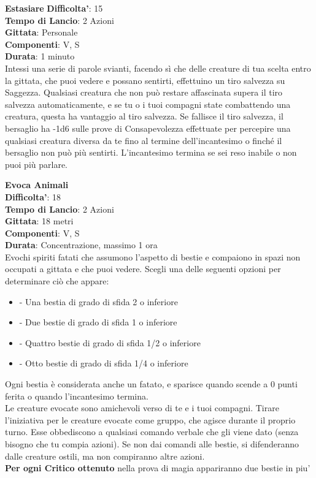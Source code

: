 \begin{multicols}{2}
\medskip\textbf{Estasiare}
\textbf{Difficolta'}: 15\\
\textbf{Tempo di Lancio}: 2 Azioni\\
\textbf{Gittata}: Personale\\
\textbf{Componenti}: V, S\\
\textbf{Durata}: 1 minuto\\
Intessi una serie di parole svianti, facendo sì che delle creature di tua scelta entro la gittata, che puoi vedere e possano sentirti, effettuino un tiro salvezza su Saggezza. Qualsiasi creatura che non può restare affascinata supera il tiro salvezza automaticamente, e se tu o i tuoi compagni state combattendo una creatura, questa ha vantaggio al tiro salvezza. Se fallisce il tiro salvezza, il bersaglio ha -1d6 sulle prove di Consapevolezza effettuate per percepire una qualsiasi creatura diversa da te fino al termine dell’incantesimo o finché il bersaglio non può più sentirti.
L’incantesimo termina se sei reso inabile o non puoi più parlare.

\medskip\textbf{Evoca Animali}\\
\textbf{Difficolta'}: 18\\
\textbf{Tempo di Lancio}: 2 Azioni\\
\textbf{Gittata}: 18 metri\\
\textbf{Componenti}: V, S\\
\textbf{Durata}: Concentrazione, massimo 1 ora\\
Evochi spiriti fatati che assumono l’aspetto di bestie e compaiono in spazi non occupati a gittata e che puoi vedere. Scegli una delle seguenti opzioni per determinare ciò che appare:
\begin{itemize}
\item
- Una bestia di grado di sfida 2 o inferiore
\item
- Due bestie di grado di sfida 1 o inferiore
\item
- Quattro bestie di grado di sfida 1/2 o inferiore
\item
- Otto bestie di grado di sfida 1/4 o inferiore
\end{itemize}
\medskip
Ogni bestia è considerata anche un fatato, e sparisce quando scende a 0 punti ferita o quando l’incantesimo termina. \\
Le creature evocate sono amichevoli verso di te e i tuoi compagni. Tirare l’iniziativa per le creature evocate come gruppo, che agisce durante il proprio turno. Esse obbediscono a qualsiasi comando verbale che gli viene dato (senza bisogno che tu compia azioni). Se non dai comandi alle bestie, si difenderanno dalle creature ostili, ma non compiranno altre azioni.\\
\textbf{Per ogni Critico ottenuto} nella prova di magia appariranno due bestie in piu'


\end{multicols}
